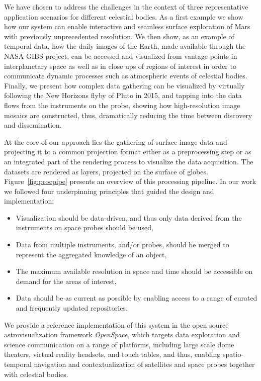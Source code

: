 \documentclass[journal]{vgtc}                %
\newcommand{\fig}[1]{Figure~\ref{fig:#1}}
\newcommand{\denselist}{\itemsep 0pt\parsep=1pt\partopsep 0pt}
\begin{document}
We have chosen to address the challenges in the context of three representative application scenarios for different celestial bodies.
As a first example we show how our system can enable interactive and seamless surface exploration of Mars with previously unprecedented resolution.
We then show, as an example of temporal data, how the daily images of the Earth, made available through the NASA GIBS project, can be accessed and visualized from vantage points in interplanetary space as well as in close ups of regions of interest in order to communicate dynamic processes such as atmospheric events of celestial bodies.
Finally, we present how complex data gathering can be visualized by virtually following the New Horizons flyby of Pluto in 2015, and tapping into the data flows from the instruments on the probe, showing how high-resolution image mosaics are constructed, thus, dramatically reducing the time between discovery and dissemination.

At the core of our approach lies the gathering of surface image data and projecting it to a common projection format either as a preprocessing step or as an integrated part of the rendering process to visualize the data acquisition.
The datasets are rendered as layers, projected on the surface of globes.
\fig{procpipe} presents an overview of this processing pipeline.
In our work we followed four underpinning principles that guided the design and implementation;
\vspace*{-1.25mm}
\begin{itemize}\denselist
  \item Visualization should be data-driven, and thus only data derived from the instruments on space probes should be used,
  \item Data from multiple instruments, and/or probes, should be merged to represent the aggregated knowledge of an object,
  \item The maximum available resolution in space and time should be accessible on demand for the areas of interest,
  \item Data should be as current as possible by enabling access to a range of curated and frequently updated repositories.
\end{itemize}

\vspace*{-1.25mm}

We provide a reference implementation of this system in the open source astrovisualization framework \emph{OpenSpace}, which targets data exploration and science communication on a range of platforms, including large scale dome theaters, virtual reality headsets, and touch tables, and thus, enabling spatio-temporal navigation and contextualization of satellites and space probes together with celestial bodies.
\end{document}
